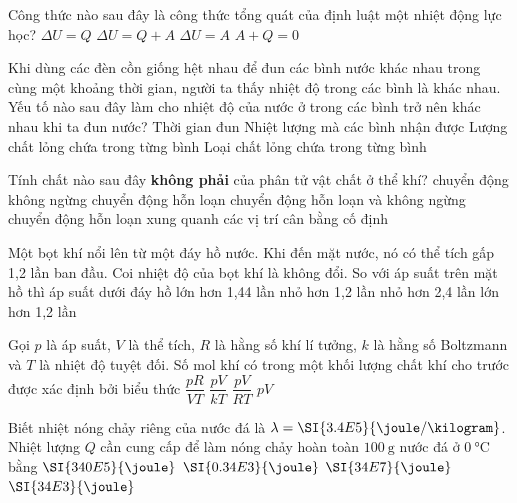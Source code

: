 \begin{ex}
	Công thức nào sau đây là công thức tổng quát của định luật một nhiệt động lực học?
	\choice
	{$\Delta U=Q$}
	{\True $\Delta U=Q+A$}
	{$\Delta U=A$}
	{$A+Q=0$}
	\loigiai{}
\end{ex}
\begin{ex}
	Khi dùng các đèn cồn giống hệt nhau để đun các bình nước khác nhau trong cùng một khoảng thời gian, người ta thấy nhiệt độ trong các bình là khác nhau. Yếu tố nào sau đây làm cho nhiệt độ của nước ở trong các bình trở nên khác nhau khi ta đun nước?
	\choice
	{Thời gian đun}
	{Nhiệt lượng mà các bình nhận được}
	{\True Lượng chất lỏng chứa trong từng bình}
	{Loại chất lỏng chứa trong từng bình}
	\loigiai{}
\end{ex}
\begin{ex}
	Tính chất nào sau đây \textbf{không phải} của phân tử vật chất ở thể khí?
	\choice
	{chuyển động không ngừng}
	{chuyển động hỗn loạn}
	{chuyển động hỗn loạn và không ngừng}
	{\True chuyển động hỗn loạn xung quanh các vị trí cân bằng cố định}
	\loigiai{}
\end{ex}
\begin{ex}
	Một bọt khí nổi lên từ một đáy hồ nước. Khi đến mặt nước, nó có thể tích gấp 1,2 lần ban đầu. Coi nhiệt độ của bọt khí là không đổi. So với áp suất trên mặt hồ thì áp suất dưới đáy hồ
	\choice
	{lớn hơn 1,44 lần}
	{nhỏ hơn 1,2 lần}
	{nhỏ hơn 2,4 lần}
	{\True lớn hơn 1,2 lần}
	\loigiai{}
\end{ex}
\begin{ex}
	Gọi $p$ là áp suất, $V$ là thể tích, $R$ là hằng số khí lí tưởng, $k$ là hằng số Boltzmann và $T$ là nhiệt độ tuyệt đối. Số mol khí có trong một khối lượng chất khí cho trước được xác định bởi biểu thức
	\choice
	{$\dfrac{pR}{VT}$}
	{$\dfrac{pV}{kT}$}
	{\True $\dfrac{pV}{RT}$}
	{$pV$}
	\loigiai{}
\end{ex}
\begin{ex}
	Biết nhiệt nóng chảy riêng của nước đá là $\lambda=\SI{3.4E5}{\joule/\kilogram}$. Nhiệt lượng $Q$ cần cung cấp để làm nóng chảy hoàn toàn $\SI{100}{\gram}$ nước đá ở $\SI{0}{\celsius}$ bằng
	\choice
	{$\SI{340E5}{\joule}$}
	{$\SI{0.34E3}{\joule}$}
	{$\SI{34E7}{\joule}$}
	{\True $\SI{34E3}{\joule}$}
	\loigiai{}
\end{ex}
